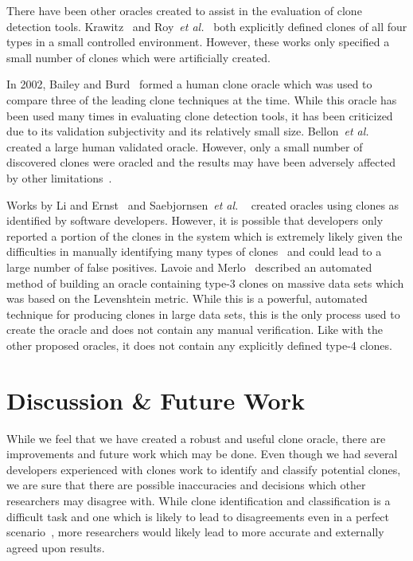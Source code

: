 \documentclass{sig-alternate}
\begin{document}
There have been other oracles created to assist in the evaluation of clone detection tools.  Krawitz~\cite{Kraw2012} and Roy~\emph{et al.}~\cite{Roy:2009:CEC:1530898.1531101} both explicitly defined clones of all four types in a small controlled environment. However, these works only specified a small number of clones which were artificially created.

In 2002, Bailey and Burd~\cite{Burd:2002:ECD:827253.827745} formed a human clone oracle which was used to compare three of the leading clone techniques at the time. While this oracle has been used many times in evaluating clone detection tools, it has been criticized due to its validation subjectivity and its relatively small size. Bellon~\emph{et al.} created a large human validated oracle. However, only a small number of discovered clones were oracled and the results may have been adversely affected by other limitations~\cite{Roy:2009:CEC:1530898.1531101}.

Works by Li and Ernst~\cite{Li:2012:CCB:2337223.2337260} and Saebjornsen~\emph{et al.} ~\cite{Saebjornsen:2009:DCC:1572272.1572287} created oracles using clones as identified by software developers. However, it is possible that developers only reported a portion of the clones in the system which is extremely likely given the difficulties in manually identifying many types of clones~\cite{Walenstein:2003:PCT:950792.951349} and could lead to a large number of false positives. Lavoie and Merlo~\cite{Lavoie:2011:ATC:1985404.1985411} described an automated method of building an oracle containing type-3 clones on massive data sets which was based on the Levenshtein metric. While this is a powerful, automated technique for producing clones in large data sets, this is the only process used to create the oracle and does not contain any manual verification. Like with the other proposed oracles, it does not contain any explicitly defined type-4 clones.


\section{Discussion \& Future Work}
\label{sec: futurework}

While we feel that we have created a robust and useful clone oracle, there are improvements and future work which may be done. Even though we had several developers experienced with clones work to identify and classify potential clones, we are sure that there are possible inaccuracies and decisions which other researchers may disagree with. While clone identification and classification is a difficult task and one which is likely to lead to disagreements even in a perfect scenario~\cite{Walenstein:2003:PCT:950792.951349}, more researchers would likely lead to more accurate and externally agreed upon results.
\end{document}
